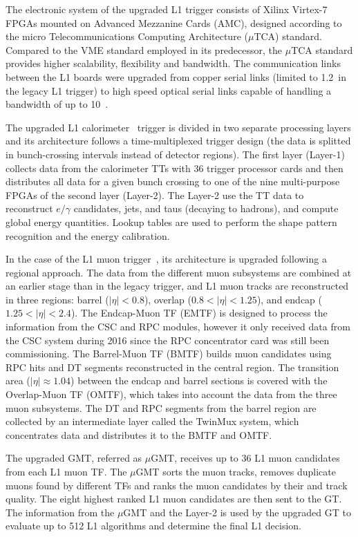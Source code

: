 The electronic system of the upgraded L1 trigger consists of Xilinx Virtex-7 FPGAs mounted on Advanced Mezzanine Cards (AMC), designed according to the micro Telecommunications Computing Architecture ($\mu$TCA) standard. Compared to the VME standard employed in its predecessor, the $\mu$TCA standard provides higher scalability, flexibility and bandwidth. The communication links between the L1 boards were upgraded from copper serial links (limited to 1.2~\Gbs in the legacy L1 trigger) to high speed optical serial links capable of handling a bandwidth of up to 10~\Gbs.

The upgraded L1 calorimeter~\cite{Stage2L1Calorimeter} trigger is divided in two separate processing layers and its architecture follows a time-multiplexed trigger design (the data is splitted in bunch-crossing intervals instead of detector regions). The first layer (Layer-1) collects data from the calorimeter TTs with 36 trigger processor cards and then distributes all data for a given bunch crossing to one of the nine multi-purpose FPGAs of the second layer (Layer-2). The Layer-2 use the TT data to reconstruct $e/\gamma$ candidates, jets, and taus  (decaying to hadrons), and compute global energy quantities. Lookup tables are used to perform the shape pattern recognition and the energy calibration.

In the case of the L1 muon trigger~\cite{Stage2L1Muon}, its architecture is upgraded following a regional  approach. The data from the different muon subsystems are combined at an earlier stage than in the legacy trigger, and L1 muon tracks are reconstructed in three regions: barrel ($|\eta| < 0.8$), overlap ($0.8 < |\eta| < 1.25$), and endcap ($1.25 < |\eta| < 2.4$). The Endcap-Muon TF (EMTF) is designed to process the information from the CSC and RPC modules, however it only received data from the CSC system during 2016 since the RPC concentrator card was still been commissioning. The Barrel-Muon TF (BMTF) builds muon candidates using RPC hits and DT segments reconstructed in the central region. The transition area ($|\eta| \approx 1.04$) between the endcap and barrel sections is covered with the Overlap-Muon TF (OMTF), which takes into account the data from the three muon subsystems. The DT and RPC segments from the barrel region are collected by an intermediate layer called the TwinMux system, which concentrates data and distributes it to the BMTF and OMTF.

The upgraded GMT, referred as $\mu$GMT, receives up to 36 L1 muon candidates from each L1 muon TF. The $\mu$GMT sorts the muon tracks, removes duplicate muons found by different TFs and ranks the muon candidates by their \pt and track quality. The eight highest ranked L1 muon candidates are then sent to the GT. The information from the $\mu$GMT and the Layer-2 is used by the upgraded GT to evaluate up to 512 L1 algorithms and determine the final L1 decision.

